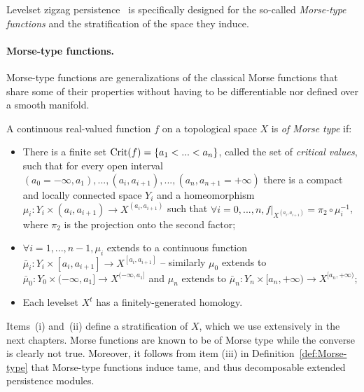 Levelset zigzag persistence~\cite{Carlsson09b} is specifically designed for the so-called {\em Morse-type functions} and the 
stratification of the space they induce.

\paragraph*{Morse-type functions.}
Morse-type functions are generalizations of the classical Morse
functions that share some of their properties without having to be
differentiable nor defined over a smooth manifold.



\begin{defin}\label{def:Morse-type}
A continuous real-valued function $f$ on a topological space $X$ is {\em of Morse type} if:

\begin{itemize}

\item[{\rm (i)}] There is a finite set $\mathrm{Crit}(f)=\{a_1<...<a_n\}$, called the set of {\em critical values},
such that for every open interval $(a_0=-\infty,a_1),...,(a_i,a_{i+1}),...,(a_n,a_{n+1}=+\infty)$
there is a compact and locally connected space $Y_i$ 
and a homeomorphism $\mu_i:Y_i\times(a_i,a_{i+1})\rightarrow X^{(a_i,a_{i+1})}$
such that $\forall i=0,...,n, f|_{X^{(a_i,a_{i+1})}}=\pi_2\circ\mu_i^{-1}$, where
$\pi_2$ is the projection onto the second factor;

\item[{\rm (ii)}] $\forall i=1,...,n-1,\mu_i$ extends to a continuous function $\bar{\mu}_i:Y_i\times[a_i,a_{i+1}]\rightarrow X^{[a_i,a_{i+1}]}$
-- similarly $\mu_0$ extends to $\bar\mu_0:Y_0\times(-\infty,a_1]\rightarrow X^{(-\infty,a_1]}$
and $\mu_n$ extends to $\bar\mu_n:Y_n\times[a_n,+\infty)\rightarrow X^{[a_n,+\infty)}$;

\item[{\rm (iii)}] Each levelset $X^t$ has a finitely-generated homology.

\end{itemize}
\end{defin}

Items~(i) and~(ii) define a stratification of $X$, which we use extensively in the next chapters.
Morse functions are known to be of Morse type while the converse is
clearly not true. Moreover, it follows from item (iii) in Definition~\ref{def:Morse-type} that
Morse-type functions induce tame, and thus decomposable %
extended persistence modules.


